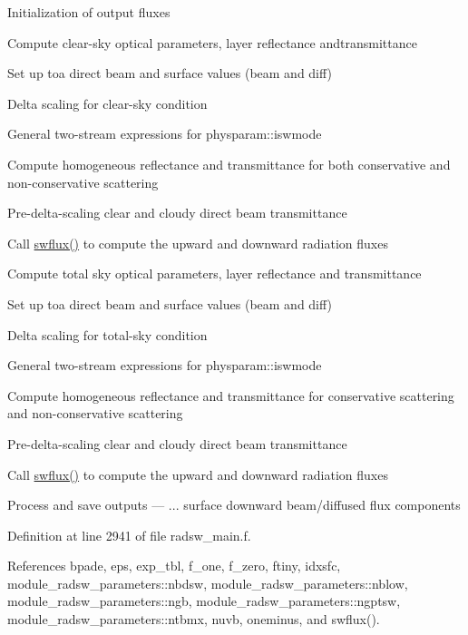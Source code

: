 \begin{DoxyEnumerate}
\item Initialization of output fluxes
\item Compute clear-\/sky optical parameters, layer reflectance andtransmittance
\begin{DoxyItemize}
\item Set up toa direct beam and surface values (beam and diff)
\item Delta scaling for clear-\/sky condition
\item General two-\/stream expressions for physparam\+::iswmode
\item Compute homogeneous reflectance and transmittance for both conservative and non-\/conservative scattering
\item Pre-\/delta-\/scaling clear and cloudy direct beam transmittance
\item Call \hyperlink{group__module__radsw__main_ga53ae1cb0229a048545027667adcc3cd7}{swflux()} to compute the upward and downward radiation fluxes
\end{DoxyItemize}
\item Compute total sky optical parameters, layer reflectance and transmittance
\begin{DoxyItemize}
\item Set up toa direct beam and surface values (beam and diff)
\item Delta scaling for total-\/sky condition
\item General two-\/stream expressions for physparam\+::iswmode
\item Compute homogeneous reflectance and transmittance for conservative scattering and non-\/conservative scattering
\item Pre-\/delta-\/scaling clear and cloudy direct beam transmittance
\item Call \hyperlink{group__module__radsw__main_ga53ae1cb0229a048545027667adcc3cd7}{swflux()} to compute the upward and downward radiation fluxes
\end{DoxyItemize}
\item Process and save outputs --- ... surface downward beam/diffused flux components 
\end{DoxyEnumerate}

Definition at line 2941 of file radsw\+\_\+main.\+f.



References bpade, eps, exp\+\_\+tbl, f\+\_\+one, f\+\_\+zero, ftiny, idxsfc, module\+\_\+radsw\+\_\+parameters\+::nbdsw, module\+\_\+radsw\+\_\+parameters\+::nblow, module\+\_\+radsw\+\_\+parameters\+::ngb, module\+\_\+radsw\+\_\+parameters\+::ngptsw, module\+\_\+radsw\+\_\+parameters\+::ntbmx, nuvb, oneminus, and swflux().



